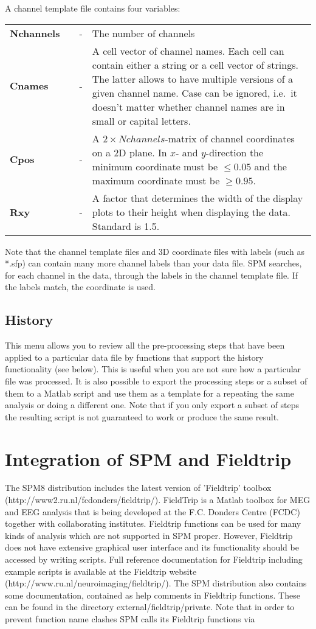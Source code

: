 A channel template file contains four variables:\\

\begin{tabular}{llcp{9cm}}
{\bf Nchannels} & &  - & The number of channels\\
{\bf Cnames}&  & - & A cell vector of channel names. Each cell can
contain either a string or a cell vector of strings. The latter allows
to have multiple versions of a given channel name. Case can be
ignored, i.e.~it doesn't matter whether channel names are in small or
capital letters.\\
{\bf Cpos} & & - & A $2 \times Nchannels$-matrix of channel
coordinates on a 2D plane. In $x$- and $y$-direction the minimum
coordinate must be $\leq 0.05$ and the maximum coordinate
must be $\geq 0.95$. \\ 
{\bf Rxy} & & - & A factor that determines the width of the display
plots to their height when displaying the data. Standard is 1.5. \\
\end{tabular}

Note that the channel template files and 3D coordinate files with labels
(such as *.sfp) can contain many more channel
labels than your data file. SPM searches, for each channel in the
data, through the labels in the channel template file. If the labels
match, the coordinate is used. 

\subsection{History}
This menu allows you to review all the pre-processing steps that have been applied
to a particular data file by functions that support the history functionality (see below).
This is useful when you are not sure how a particular file was processed. It is also possible
to export the processing steps or a subset of them to a Matlab script and use them as a template
for a repeating the same analysis or doing a different one. Note that if you only export a subset
of steps the resulting script is not guaranteed to work or produce the same result.

\section{Integration of SPM and Fieldtrip}
The SPM8 distribution includes the latest version of 'Fieldtrip' toolbox
(http://www2.ru.nl/fcdonders/fieldtrip/). FieldTrip is a Matlab
toolbox for MEG and EEG analysis that is being developed at the
F.C. Donders Centre (FCDC) together with collaborating
institutes. Fieldtrip functions can be used for many kinds of analysis
which are not supported in SPM proper. However, Fieldtrip
does not have extensive graphical user interface and its functionality
should be accessed by writing scripts. Full reference documentation
for Fieldtrip including example scripts is available at the Fieldtrip
website (http://www.ru.nl/neuroimaging/fieldtrip/). The SPM
distribution also contains some documentation, contained as help
comments in Fieldtrip functions. These can be found in the directory 
external/fieldtrip/private. Note that in order to prevent function
name clashes SPM calls its Fieldtrip functions via 


